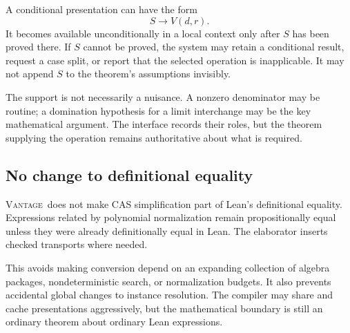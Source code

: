 \documentclass[11pt,a4paper]{article}
\newcommand{\Vantage}{\textsc{Vantage}}
\theoremstyle{definition}
\begin{document}
A conditional presentation can have the form
\[
 S\longrightarrow V(d,r).
\]
It becomes available unconditionally in a local context only after \(S\) has been
proved there. If \(S\) cannot be proved, the system may retain a conditional result,
request a case split, or report that the selected operation is inapplicable. It
may not append \(S\) to the theorem's assumptions invisibly.

The support is not necessarily a nuisance. A nonzero denominator may be routine;
a domination hypothesis for a limit interchange may be the key mathematical
argument. The interface records their roles, but the theorem supplying the
operation remains authoritative about what is required.

\subsection{No change to definitional equality}
\Vantage\ does not make CAS simplification part of Lean's definitional equality.
Expressions related by polynomial normalization remain propositionally equal
unless they were already definitionally equal in Lean. The elaborator inserts
checked transports where needed.

This avoids making conversion depend on an expanding collection of algebra
packages, nondeterministic search, or normalization budgets. It also prevents
accidental global changes to instance resolution. The compiler may share and
cache presentations aggressively, but the mathematical boundary is still an
ordinary theorem about ordinary Lean expressions.

\begin{center}
\end{center}
\end{document}
